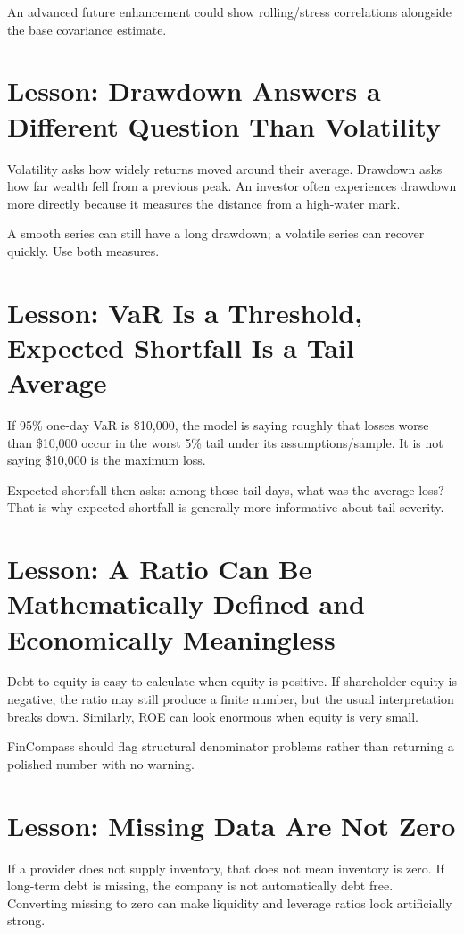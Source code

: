 \documentclass[11pt]{article}
\begin{document}
An advanced future enhancement could show rolling/stress correlations alongside the base covariance estimate.

\section{Lesson: Drawdown Answers a Different Question Than Volatility}
Volatility asks how widely returns moved around their average. Drawdown asks how far wealth fell from a previous peak. An investor often experiences drawdown more directly because it measures the distance from a high-water mark.

A smooth series can still have a long drawdown; a volatile series can recover quickly. Use both measures.

\section{Lesson: VaR Is a Threshold, Expected Shortfall Is a Tail Average}
If 95\% one-day VaR is \$10,000, the model is saying roughly that losses worse than \$10,000 occur in the worst 5\% tail under its assumptions/sample. It is not saying \$10,000 is the maximum loss.

Expected shortfall then asks: among those tail days, what was the average loss? That is why expected shortfall is generally more informative about tail severity.

\section{Lesson: A Ratio Can Be Mathematically Defined and Economically Meaningless}
Debt-to-equity is easy to calculate when equity is positive. If shareholder equity is negative, the ratio may still produce a finite number, but the usual interpretation breaks down. Similarly, ROE can look enormous when equity is very small.

FinCompass should flag structural denominator problems rather than returning a polished number with no warning.

\section{Lesson: Missing Data Are Not Zero}
If a provider does not supply inventory, that does not mean inventory is zero. If long-term debt is missing, the company is not automatically debt free. Converting missing to zero can make liquidity and leverage ratios look artificially strong.
\end{document}
